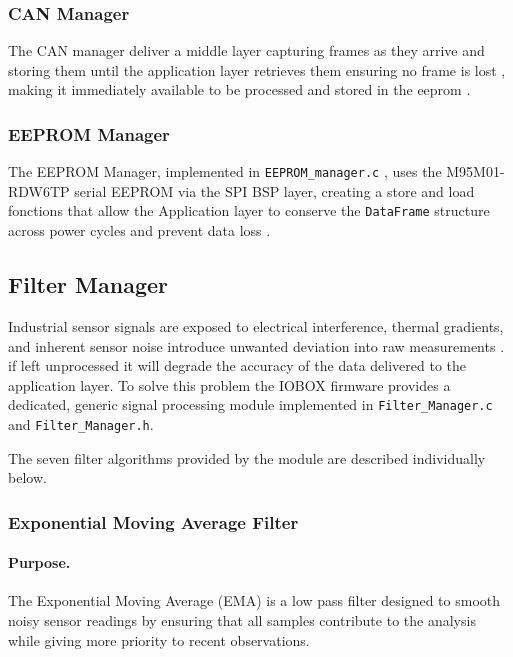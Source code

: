\subsubsection{CAN Manager}

The CAN manager deliver a middle layer capturing frames as they arrive and storing them until the application layer retrieves them ensuring no frame is lost , making it immediately available to be processed and stored in the eeprom .          

\subsubsection{EEPROM Manager}

The EEPROM Manager, implemented in \texttt{EEPROM\_manager.c} , uses the M95M01-RDW6TP serial EEPROM via the SPI BSP layer, creating a store and load fonctions that allow the Application layer to conserve the \texttt{DataFrame} structure across power cycles and prevent data loss .

\subsection{Filter Manager}

Industrial sensor signals are exposed to  electrical interference, thermal 
gradients, and inherent sensor noise introduce unwanted deviation into raw 
measurements . 
 if left unprocessed it will degrade the accuracy of the data delivered to the application layer. To solve this problem  the IOBOX firmware provides a 
dedicated, generic signal processing module implemented in 
\texttt{Filter\_Manager.c} and \texttt{Filter\_Manager.h}.



The seven filter algorithms provided by the module are described individually below.

\subsubsection{Exponential Moving Average Filter}

\paragraph{Purpose.}
The Exponential Moving Average (EMA) is a low pass filter designed to smooth 
noisy sensor readings by ensuring that all samples contribute to the analysis while giving more priority to recent observations.

